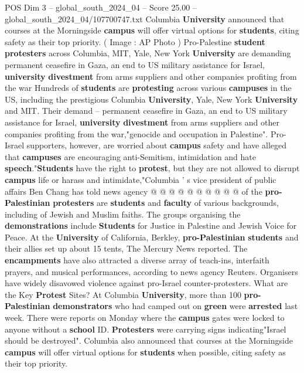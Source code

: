 \begin{textsample}{POS Dim 3 – global\_south\_2024\_04 – Score 25.00 – global\_south\_2024\_04/107700747.txt}  \label{ex:f3_pos_209}
Columbia \textbf{University} announced that courses at the Morningside \textbf{campus} will offer virtual options for \textbf{students}, citing safety as their top priority. ( Image : AP Photo ) Pro-Palestine \textbf{student} \textbf{protesters} across Columbia, MIT, Yale, New York \textbf{University} are demanding permanent ceasefire in Gaza, an end to US military assistance for Israel, \textbf{university} \textbf{divestment} from arms suppliers and other companies profiting from the war Hundreds of \textbf{students} are \textbf{protesting} across various \textbf{campuses} in the US, including the prestigious Columbia \textbf{University}, Yale, New York \textbf{University} and MIT.
Their demand -- permanent ceasefire in Gaza, an end to US military assistance for Israel, \textbf{university} \textbf{divestment} from arms suppliers and other companies profiting from the war,"genocide and occupation in Palestine".
Pro-Israel supporters, however, are worried about \textbf{campus} safety and have alleged that \textbf{campuses} are encouraging anti-Semitism, intimidation and hate \textbf{speech}."\textbf{Students} have the right to \textbf{protest}, but they are not allowed to disrupt \textbf{campus} life or harass and intimidate,"Columbia ' s vice president of public affairs Ben Chang has told news agency @ @ @ @ @ @ @ @ @ @ of the \textbf{pro-Palestinian} \textbf{protesters} are \textbf{students} and \textbf{faculty} of various backgrounds, including of Jewish and Muslim faiths.
The groups organising the \textbf{demonstrations} include \textbf{Students} for Justice in Palestine and Jewish Voice for Peace.
At the \textbf{University} of California, Berkley, \textbf{pro-Palestinian} \textbf{students} and their allies set up about 15 tents, The Mercury News reported.
The \textbf{encampments} have also attracted a diverse array of teach-ins, interfaith prayers, and musical performances, according to news agency Reuters.
Organisers have widely disavowed violence against pro-Israel counter-protesters.
What are the Key \textbf{Protest} Sites?
At Columbia \textbf{University}, more than 100 \textbf{pro-Palestinian} \textbf{demonstrators} who had camped out on \textbf{green} were \textbf{arrested} last week.
There were reports on Monday where the \textbf{campus} gates were locked to anyone without a \textbf{school} ID. \textbf{Protesters} were carrying signs indicating"Israel should be destroyed".
Columbia also announced that courses at the Morningside \textbf{campus} will offer virtual options for \textbf{students} when possible, citing safety as their top priority.

\end{textsample}
